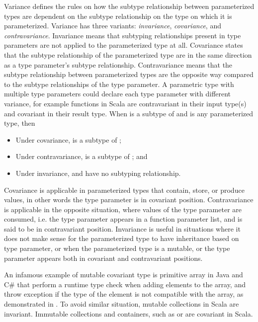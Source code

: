 Variance defines the rules on how the subtype relationship between parameterized types are dependent on the subtype relationship on the type on which it is parameterized. Variance has three variants: \textit{invariance}, \textit{covariance}, and \textit{contravariance}. Invariance means that subtyping relationships present in type parameters are not applied to the parameterized type at all. Covariance states that the subtype relationship of the parameterized type are in the same direction as a type parameter's subtype relationship. Contravariance means that the subtype relationship between parameterized types are the opposite way compared to the subtype relationships of the type parameter. A parametric type with multiple type parameters could declare each type parameter with different variance, for example functions in Scala are contravariant in their input type(s) and covariant in their result type. When  is a subtype of  and  is any parameterized type, then
\begin{itemize}
    \item Under covariance,  is a subtype of ;
    \item Under contravariance,  is a subtype of ; and
    \item Under invariance,  and  have no subtyping relationship.
\end{itemize}

Covariance is applicable in parameterized types that contain, store, or produce values, in other words the type parameter is in covariant position. Contravariance is applicable in the opposite situation, where values of the type parameter are consumed, i.e. the type parameter appears in a function parameter list, and is said to be in contravariant position. Invariance is useful in situations where it does not make sense for the parameterized type to have inheritance based on type parameter, or when the parameterized type is a mutable, or the type parameter appears both in covariant and contravariant positions.

An infamous example of mutable covariant type is primitive array in Java and C\# that perform a runtime type check when adding elements to the array, and throw exception if the type of the element is not compatible with the array, as demonstrated in .
To avoid similar situation, mutable collections in Scala are invariant. Immutable collections and containers, such as  or  are covariant in Scala.

